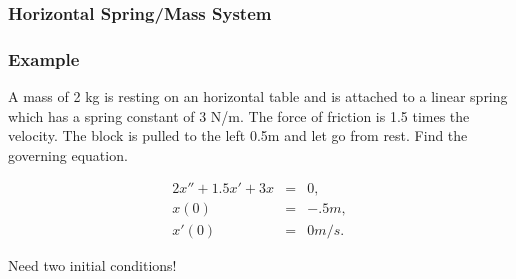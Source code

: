 \begin{frame}
  \frametitle{Horizontal Spring/Mass System}



\end{frame}


\begin{frame}
  \frametitle{Example}

  A mass of 2 kg is resting on an horizontal table and is attached to
  a linear spring which has a spring constant of 3 N/m. The force of
  friction is 1.5 times the velocity. The block is pulled to the left
  0.5m and let go from rest. Find the governing equation.

  {
    \begin{eqnarray*}
      2 x'' + 1.5 x' + 3x & = & 0, \\
      x(0) & = & -.5m, \\
      x'(0) & = & 0 m/s.
    \end{eqnarray*}

    Need two initial conditions!
  }

\end{frame}


